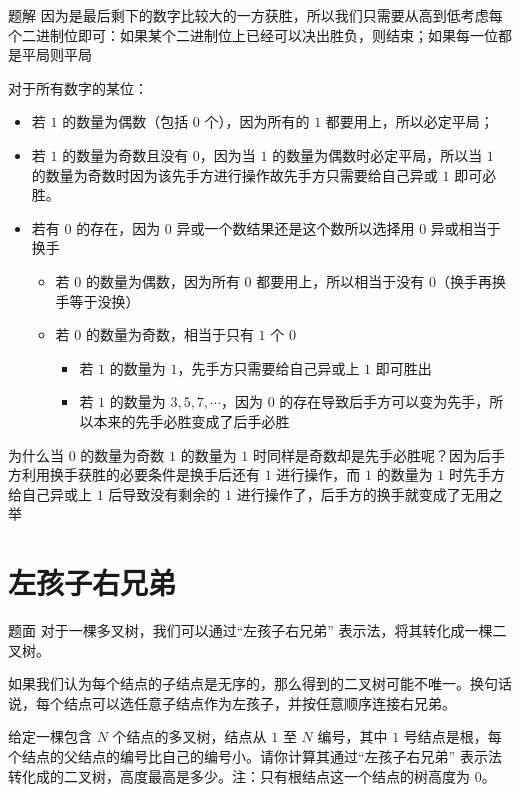 \documentclass{pptt}
\begin{document}
\begin{frame}{题解}
    因为是最后剩下的数字比较大的一方获胜，所以我们只需要从高到低考虑每个二进制位即可：如果某个二进制位上已经可以决出胜负，则结束；如果每一位都是平局则平局

    对于所有数字的某位：

    \begin{itemize}
        \item 若 $1$ 的数量为偶数（包括 $0$ 个），因为所有的 $1$ 都要用上，所以必定平局；
        \item 若 $1$ 的数量为奇数且没有 $0$，因为当 $1$ 的数量为偶数时必定平局，所以当 $1$ 的数量为奇数时因为该先手方进行操作故先手方只需要给自己异或 $1$ 即可必胜。
        \item 若有 $0$ 的存在，因为 $0$ 异或一个数结果还是这个数所以选择用 $0$ 异或相当于换手
              \begin{itemize}
                  \item 若 $0$ 的数量为偶数，因为所有 $0$ 都要用上，所以相当于没有 $0$（换手再换手等于没换）
                  \item 若 $0$ 的数量为奇数，相当于只有 $1$ 个 $0$
                        \begin{itemize}
                            \item 若 $1$ 的数量为 $1$，先手方只需要给自己异或上 $1$ 即可胜出
                            \item 若 $1$ 的数量为 $3,5,7,\cdots$，因为 $0$ 的存在导致后手方可以变为先手，所以本来的先手必胜变成了后手必胜
                        \end{itemize}
              \end{itemize}
    \end{itemize}

    为什么当 $0$ 的数量为奇数 $1$ 的数量为 $1$ 时同样是奇数却是先手必胜呢？因为后手方利用换手获胜的必要条件是换手后还有 $1$ 进行操作，而 $1$ 的数量为 $1$ 时先手方给自己异或上 $1$ 后导致没有剩余的 $1$ 进行操作了，后手方的换手就变成了无用之举
\end{frame}

\section{左孩子右兄弟}

\begin{frame}{题面}
    对于一棵多叉树，我们可以通过“左孩子右兄弟” 表示法，将其转化成一棵二叉树。

    如果我们认为每个结点的子结点是无序的，那么得到的二叉树可能不唯一。换句话说，每个结点可以选任意子结点作为左孩子，并按任意顺序连接右兄弟。

    给定一棵包含 $N$ 个结点的多叉树，结点从 $1$ 至 $N$ 编号，其中 $1$ 号结点是根，每个结点的父结点的编号比自己的编号小。请你计算其通过“左孩子右兄弟” 表示法转化成的二叉树，高度最高是多少。注：只有根结点这一个结点的树高度为 $0$。
\end{frame}
\end{document}
